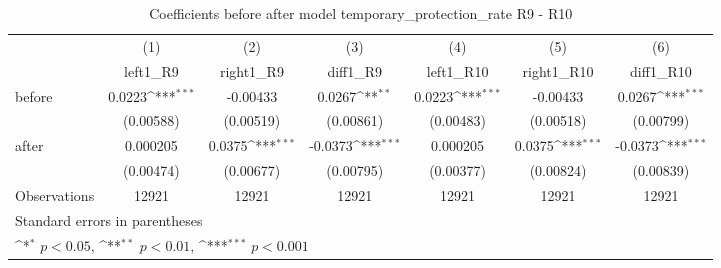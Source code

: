 \begin{table}[!ht]\centering \footnotesize
\def\sym#1{\ifmmode^{#1}\else\(^{#1}\)\fi}
\caption{Coefficients before after model temporary\_protection\_rate R9 - R10}
\begin{tabular}{l*{6}{c}}
\hline\hline
                    &\multicolumn{1}{c}{(1)}&\multicolumn{1}{c}{(2)}&\multicolumn{1}{c}{(3)}&\multicolumn{1}{c}{(4)}&\multicolumn{1}{c}{(5)}&\multicolumn{1}{c}{(6)}\\
                    &\multicolumn{1}{c}{left1\_R9}&\multicolumn{1}{c}{right1\_R9}&\multicolumn{1}{c}{diff1\_R9}&\multicolumn{1}{c}{left1\_R10}&\multicolumn{1}{c}{right1\_R10}&\multicolumn{1}{c}{diff1\_R10}\\
\hline
before              &      0.0223\sym{***}&    -0.00433         &      0.0267\sym{**} &      0.0223\sym{***}&    -0.00433         &      0.0267\sym{***}\\
                    &   (0.00588)         &   (0.00519)         &   (0.00861)         &   (0.00483)         &   (0.00518)         &   (0.00799)         \\
[1em]
after               &    0.000205         &      0.0375\sym{***}&     -0.0373\sym{***}&    0.000205         &      0.0375\sym{***}&     -0.0373\sym{***}\\
                    &   (0.00474)         &   (0.00677)         &   (0.00795)         &   (0.00377)         &   (0.00824)         &   (0.00839)         \\
\hline
Observations        &       12921         &       12921         &       12921         &       12921         &       12921         &       12921         \\
\hline\hline
\multicolumn{7}{l}{\footnotesize Standard errors in parentheses}\\
\multicolumn{7}{l}{\footnotesize \sym{*} \(p<0.05\), \sym{**} \(p<0.01\), \sym{***} \(p<0.001\)}\\
\end{tabular}
\end{table}
